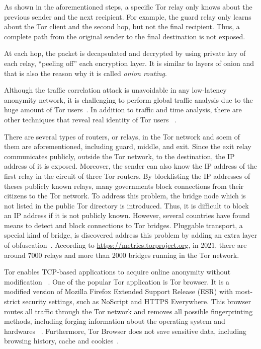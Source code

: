 As shown in the aforementioned steps, a specific Tor relay only knows about the previous
sender and the next recipient. For example, the guard relay only learns about the Tor client
and the second hop, but not the final recipient. Thus, a complete path from the original
sender to the final destination is not exposed.

At each hop, the packet is decapsulated and decrypted by using private key of each relay,
``peeling off'' each encryption layer. It is similar to layers of onion and that is also
the reason why it is called \emph{onion routing}.

Although the traffic correlation attack is unavoidable in any low-latency anonymity
network, it is challenging to perform global traffic analysis due to the huge amount
of Tor users~\cite{dis:anonymity_system,paper:tor_design}. In addition to traffic and
time analysis, there are other techniques that reveal real identity of Tor users
~\cite{paper:de_tor}.

There are several types of routers, or relays, in the Tor network and soem of them
are aforementioned, including guard, middle, and exit. Since the exit relay communicates
publicly, outside the Tor network, to the destination, the IP address of it is exposed.
Moreover, the sender can also know the IP address of the first relay in the circuit of
three Tor routers.
By blocklisting the IP addresses of theses publicly known relays, many governments block
connections from their citizens to the Tor network. To address this problem, the bridge
node which is not listed in the public Tor directory is introduced. Thus, it is difficult
to block an IP address if it is not publicly known. However, several countries have
found means to detect and block connections to Tor bridges. Pluggable transport, a
special kind of bridge, is discovered address this problem by adding an extra layer
of obfuscation~\cite{web:relay_types}. According to \url{https://metrics.torproject.org},
in 2021, there are around 7000 relays and more than 2000 bridges running in the Tor
network.

Tor enables TCP-based applications to acquire online anonymity without modification
~\cite{paper:tor_design}. One of the popular Tor application is Tor browser. It is
a modified version of Mozilla Firefox Extended Support Release (ESR) with most-strict
security settings, such as NoScript and HTTPS Everywhere. This browser routes all
traffic through the Tor network and removes all possible fingerprinting methods,
including forging information about the operating system and hardwares
~\cite{dis:usage_of_onion_services}.
Furthermore, Tor Browser does not save sensitive data, including browsing history,
cache and cookies~\cite{dis:usage_of_onion_services}.

